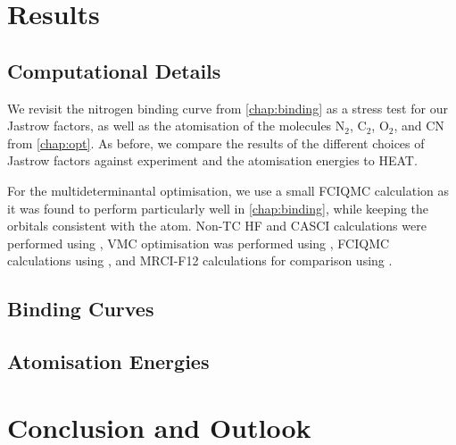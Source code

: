 \section{Results}

\subsection{Computational Details}

We revisit the nitrogen binding curve from \autoref{chap:binding} as a stress test for our Jastrow factors, as well as the atomisation of the molecules N$_2$, C$_2$, O$_2$, and CN from \autoref{chap:opt}. As before, we compare the results of the different choices of Jastrow factors against experiment\supercite{leroyAccurate2006} and the atomisation energies to HEAT\supercite{fellerSurvey2008}.

For the multideterminantal optimisation, we use a small FCIQMC calculation as it was found to perform particularly well in \autoref{chap:binding}, while keeping the orbitals consistent with the atom. Non-TC HF and CASCI calculations were performed using \pyscf\supercite{sunPySCF2018}, VMC optimisation was performed using \casino\supercite{needsVariational2020}, FCIQMC calculations using \neci\supercite{gutherNECI2020}, and MRCI-F12 calculations for comparison using \molpro.\supercite{wernerMOLPRO,wernerMolpro2012,wernerMolproQuantumChemistry2020}

\subsection{Binding Curves}

\subsection{Atomisation Energies}


\section{Conclusion and Outlook}

